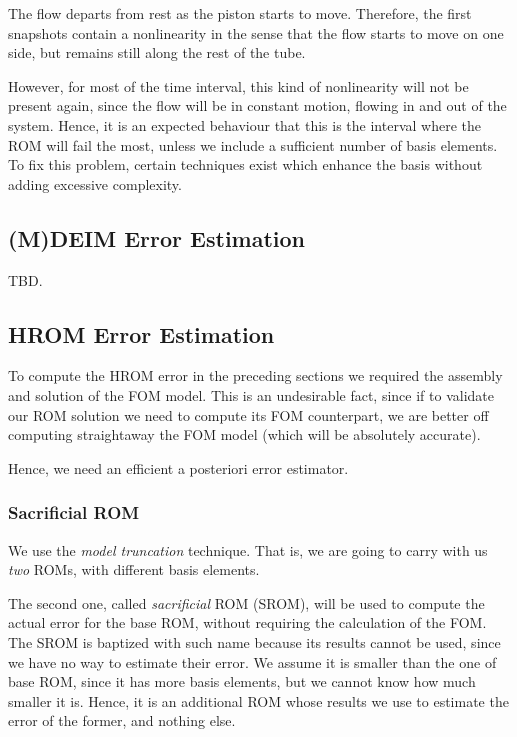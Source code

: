 \documentclass[../../thesis.tex]{subfiles}
\begin{document}
The flow departs from rest as the piston starts to move.
Therefore, the first snapshots contain a nonlinearity in the sense that the flow starts to move on one side, 
but remains still along the rest of the tube.

However, for most of the time interval, this kind of nonlinearity will not be present again,
since the flow will be in constant motion, flowing in and out of the system.
Hence, it is an expected behaviour that this is the interval where the ROM will fail the most,
unless we include a sufficient number of basis elements.
To fix this problem, certain techniques exist which enhance the basis without adding excessive complexity.

\subsection{(M)DEIM Error Estimation}
TBD.

\subsection{HROM Error Estimation}
\label{sec:hrom_results_posteriori_error_estimation}
To compute the HROM error in the preceding sections
we required the assembly and solution of the FOM model.
This is an undesirable fact, since if to validate our ROM solution
we need to compute its FOM counterpart, 
we are better off computing straightaway the FOM model 
(which will be absolutely accurate).

Hence, we need an efficient a posteriori error estimator.

\subsubsection{Sacrificial ROM}
We use the \textit{model truncation} technique.
That is, we are going to carry with us \textit{two} ROMs,
with different basis elements.

The second one, called \textit{sacrificial} ROM (SROM),
will be used to compute the actual error for the base ROM,
without requiring the calculation of the FOM.
The SROM is baptized with such name because its results cannot be used,
since we have no way to estimate their error.
We assume it is smaller than the one of base ROM, since it has more basis elements,
but we cannot know how much smaller it is.
Hence, it is an additional ROM whose results we use to estimate the error of the former, 
and nothing else.
\end{document}
